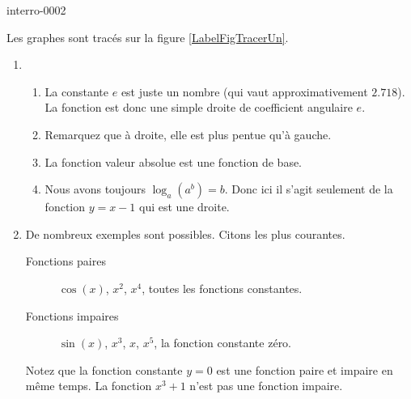 
\begin{corrige}{interro-0002}

\newcommand{\CaptionFigTracerUn}{Les fonctions de la question \ref{exointerro-0002}.}


Les graphes sont tracés sur la figure \ref{LabelFigTracerUn}.

\begin{enumerate}
	\item
		\begin{enumerate}
			\item
				La constante $e$ est juste un nombre (qui vaut approximativement $2.718$). La fonction est donc une simple droite de coefficient angulaire $e$.
			\item
				Remarquez que à droite, elle est plus pentue qu'à gauche.
			\item
				La fonction valeur absolue est une fonction de base.
			\item
				Nous avons toujours $\log_a(a^b)=b$. Donc ici il s'agit seulement de la fonction $y=x-1$ qui est une droite.
		\end{enumerate}
	\item
		De nombreux exemples sont possibles. Citons les plus courantes.
		\begin{description}
			\item[Fonctions paires] $\cos(x)$, $x^2$, $x^4$, toutes les fonctions constantes.
			\item[Fonctions impaires] $\sin(x)$, $x^3$, $x$, $x^5$, la fonction constante zéro.
		\end{description}
		Notez que la fonction constante $y=0$ est une fonction paire et impaire en même temps. La fonction $x^3+1$ n'est pas une fonction impaire.

\end{enumerate}

\end{corrige}

\clearpage
